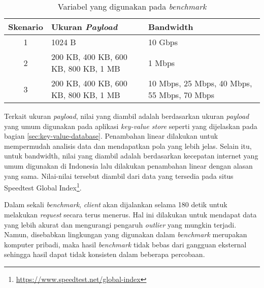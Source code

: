 \begin{table}[ht]
  \centering
  \caption{Variabel yang digunakan pada \textit{benchmark}}
  \label{tab:variabel-benchmark}
  \begin{tabular}{|c|p{5.5cm}|p{5.5cm}|}
    \hline
    \textbf{Skenario} & \textbf{Ukuran \textit{Payload}} & \textbf{Bandwidth} \\ \hline
    1 & 1024 B & 10 Gbps \\ \hline
    2 & 200 KB, 400 KB, 600 KB, 800 KB, 1 MB & 1 Mbps \\ \hline
    3 & 200 KB, 400 KB, 600 KB, 800 KB, 1 MB & 10 Mbps, 25 Mbps, 40 Mbps, 55 Mbps, 70 Mbps \\ \hline
  \end{tabular}
\end{table}

Terkait ukuran \textit{payload}, nilai yang diambil adalah berdasarkan ukuran \textit{payload} yang umum digunakan pada aplikasi \textit{key-value store} seperti yang dijelaskan pada bagian \ref{sec:key-value-database}. Penambahan linear dilakukan untuk mempermudah analisis data dan mendapatkan pola yang lebih jelas. Selain itu, untuk bandwidth, nilai yang diambil adalah berdasarkan kecepatan internet yang umum digunakan di Indonesia lalu dilakukan penambahan linear dengan alasan yang sama. Nilai-nilai tersebut diambil dari data yang tersedia pada situs Speedtest Global Index\footnote{\url{https://www.speedtest.net/global-index}}.

Dalam sekali \textit{benchmark}, \textit{client} akan dijalankan selama 180 detik untuk melakukan \textit{request} secara terus menerus. Hal ini dilakukan untuk mendapat data yang lebih akurat dan mengurangi pengaruh \textit{outlier} yang mungkin terjadi. Namun, disebabkan lingkungan yang digunakan dalam \textit{benchmark} merupakan komputer pribadi, maka hasil \textit{benchmark} tidak bebas dari gangguan eksternal sehingga hasil dapat tidak konsisten dalam beberapa percobaan.